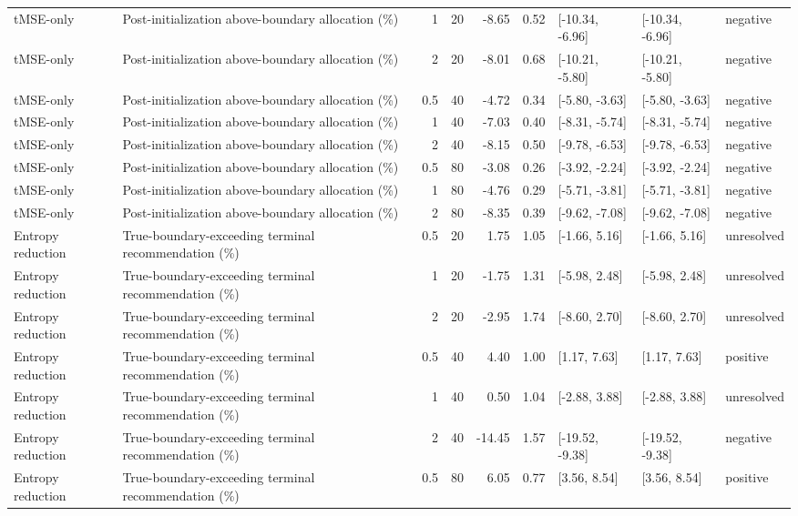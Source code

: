 \begin{longtable}{p{1.8cm}p{3.0cm}rrrrp{2.6cm}p{2.6cm}p{1.6cm}}
tMSE-only & Post-initialization above-boundary allocation (\%) & 1 & 20 & -8.65 & 0.52 & [-10.34, -6.96] & [-10.34, -6.96] & negative \\
tMSE-only & Post-initialization above-boundary allocation (\%) & 2 & 20 & -8.01 & 0.68 & [-10.21, -5.80] & [-10.21, -5.80] & negative \\
tMSE-only & Post-initialization above-boundary allocation (\%) & 0.5 & 40 & -4.72 & 0.34 & [-5.80, -3.63] & [-5.80, -3.63] & negative \\
tMSE-only & Post-initialization above-boundary allocation (\%) & 1 & 40 & -7.03 & 0.40 & [-8.31, -5.74] & [-8.31, -5.74] & negative \\
tMSE-only & Post-initialization above-boundary allocation (\%) & 2 & 40 & -8.15 & 0.50 & [-9.78, -6.53] & [-9.78, -6.53] & negative \\
tMSE-only & Post-initialization above-boundary allocation (\%) & 0.5 & 80 & -3.08 & 0.26 & [-3.92, -2.24] & [-3.92, -2.24] & negative \\
tMSE-only & Post-initialization above-boundary allocation (\%) & 1 & 80 & -4.76 & 0.29 & [-5.71, -3.81] & [-5.71, -3.81] & negative \\
tMSE-only & Post-initialization above-boundary allocation (\%) & 2 & 80 & -8.35 & 0.39 & [-9.62, -7.08] & [-9.62, -7.08] & negative \\
Entropy reduction & True-boundary-exceeding terminal recommendation (\%) & 0.5 & 20 & 1.75 & 1.05 & [-1.66, 5.16] & [-1.66, 5.16] & unresolved \\
Entropy reduction & True-boundary-exceeding terminal recommendation (\%) & 1 & 20 & -1.75 & 1.31 & [-5.98, 2.48] & [-5.98, 2.48] & unresolved \\
Entropy reduction & True-boundary-exceeding terminal recommendation (\%) & 2 & 20 & -2.95 & 1.74 & [-8.60, 2.70] & [-8.60, 2.70] & unresolved \\
Entropy reduction & True-boundary-exceeding terminal recommendation (\%) & 0.5 & 40 & 4.40 & 1.00 & [1.17, 7.63] & [1.17, 7.63] & positive \\
Entropy reduction & True-boundary-exceeding terminal recommendation (\%) & 1 & 40 & 0.50 & 1.04 & [-2.88, 3.88] & [-2.88, 3.88] & unresolved \\
Entropy reduction & True-boundary-exceeding terminal recommendation (\%) & 2 & 40 & -14.45 & 1.57 & [-19.52, -9.38] & [-19.52, -9.38] & negative \\
Entropy reduction & True-boundary-exceeding terminal recommendation (\%) & 0.5 & 80 & 6.05 & 0.77 & [3.56, 8.54] & [3.56, 8.54] & positive \\

\end{longtable}
